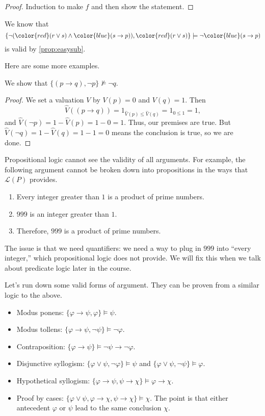\documentclass[../notes.tex]{subfiles}
\begin{document}
\begin{proof}
	Induction to make $f$ and then show the statement.
\end{proof}
\begin{example}
	We know that
	\[\{\lnot({\color{red}(r\lor s)}\land{\color{blue}(s\to p)}),{\color{red}(r\lor s)}\}\models\lnot{\color{blue}(s\to p)}\]
	is valid by \autoref{prop:easysub}.
\end{example}
Here are some more examples.
\begin{exe}
	We show that $\{(p\to q),\lnot p\}\nvDash\lnot q$.
\end{exe}
\begin{proof}
	We set a valuation $V$ by $V(p)=0$ and $V(q)=1$. Then
	\[\hat V((p\to q))=1_{\hat V(p)\le\hat V(q)}=1_{0\le1}=1,\]
	and $\hat V(\lnot p)=1-\hat V(p)=1-0=1$. Thus, our premises are true. But $\hat V(\lnot q)=1-\hat V(q)=1-1=0$ means the conclusion is true, so we are done.
\end{proof}
\begin{remark}
	Propositional logic cannot see the validity of all arguments. For example, the following argument cannot be broken down into propositions in the ways that $\mathcal L(P)$ provides.
	\begin{enumerate}
		\item Every integer greater than $1$ is a product of prime numbers.
		\item $999$ is an integer greater than $1$.
		\item Therefore, $999$ is a product of prime numbers.
	\end{enumerate}
	The issue is that we need quantifiers: we need a way to plug in $999$ into ``every integer,'' which propositional logic does not provide. We will fix this when we talk about predicate logic later in the course.
\end{remark}
Let's run down some valid forms of argument. They can be proven from a similar logic to the above.
\begin{itemize}
	\item Modus ponens: $\{\varphi\to\psi,\varphi\}\models\psi$.
	\item Modus tollens: $\{\varphi\to\psi,\lnot\psi\}\models\lnot\varphi$.
	\item Contraposition: $\{\varphi\to\psi\}\models\lnot\psi\to\lnot\varphi$.
	\item Disjunctive syllogism: $\{\varphi\lor\psi,\lnot\varphi\}\models\psi$ and $\{\varphi\lor\psi,\lnot\psi\}\models\varphi$.
	\item Hypothetical syllogism: $\{\varphi\to\psi,\psi\to\chi\}\models\varphi\to\chi$.
	\item Proof by cases: $\{\varphi\lor\psi,\varphi\to\chi,\psi\to\chi\}\models\chi$. The point is that either antecedent $\varphi$ or $\psi$ lead to the same conclusion $\chi$.
\end{itemize}
\end{document}
